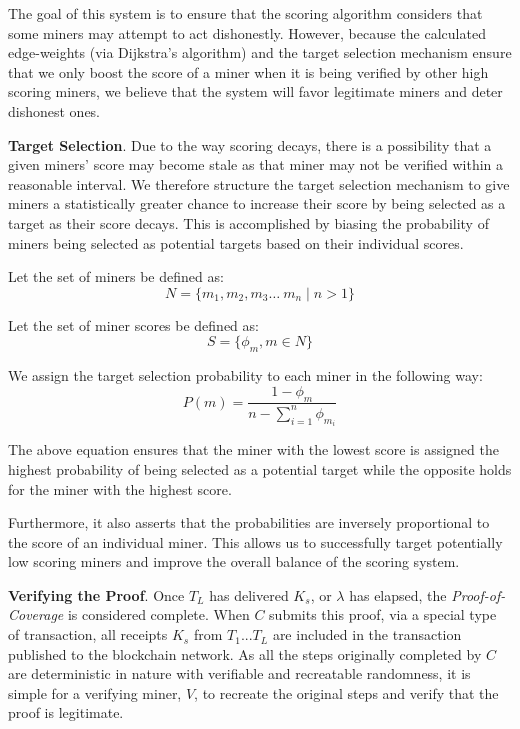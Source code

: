 \documentclass[UTF8, 10pt, nonatbib, nocopyrightspace, reprint]{sigplanconf}
\begin{document}
The goal of this system is to ensure that the scoring algorithm considers that some miners may attempt to act dishonestly. However, because the calculated edge-weights (via Dijkstra's algorithm) and the target selection mechanism ensure that we only boost the score of a miner when it is being verified by other high scoring miners, we believe that the system will favor legitimate miners and deter dishonest ones.

\textbf{Target Selection}. Due to the way scoring decays, there is a possibility that a given miners' score may become stale as that miner may not be verified within a reasonable interval. We therefore structure the target selection mechanism to give miners a statistically greater chance to increase their score by being selected as a target as their score decays. This is accomplished by biasing the probability of miners being selected as potential targets based on their individual scores.

Let the set of miners be defined as:
\begin{equation*} \label{set-of-miners}
        N = \{m_1, m_2, m_3 \dots\ m_n \mid n > 1\}
\end{equation*}

Let the set of miner scores be defined as:
\begin{equation*} \label{set-of-scores}
        S = \{\phi_m, m \in N\}
\end{equation*}

We assign the target selection probability to each miner in the following way:
\begin{equation*} \label{target-selection-probability}
        P(m) = \frac{1-\phi_m}{n - \displaystyle\sum_{i=1}^{n} {\phi_{m_i}}}
\end{equation*}

The above equation ensures that the miner with the lowest score is assigned the highest probability of being selected as a potential target while the opposite holds for the miner with the highest score.

Furthermore, it also asserts that the probabilities are inversely proportional to the score of an individual miner. This allows us to successfully target potentially low scoring miners and improve the overall balance of the scoring system.

\textbf{Verifying the Proof}. Once $T_L$ has delivered $K_s$, or $\lambda$ has elapsed, the \emph{Proof-of-Coverage} is considered complete. When $C$ submits this proof, via a special type of transaction, all receipts $K_s$ from $T_1$...$T_L$ are included in the transaction published to the blockchain network. As all the steps originally completed by $C$ are deterministic in nature with verifiable and recreatable randomness, it is simple for a verifying miner, $V$, to recreate the original steps and verify that the proof is legitimate.
\end{document}
